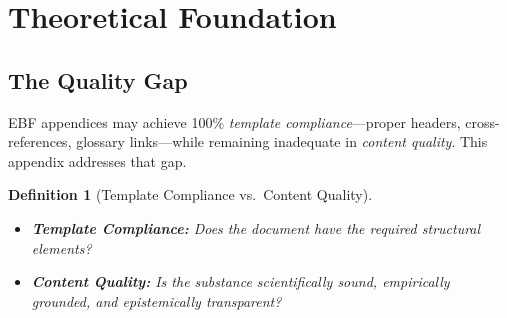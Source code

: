\documentclass[11pt,a4paper]{article}
\newtheorem{definition}{Definition}[section]
\begin{document}

\begin{abstract}
This appendix establishes the Quality Assessment Framework for EBF, distinguishing \emph{template compliance} (formal structure) from \emph{content quality} (scientific substance). The TERAN framework—assessing Theory, Evidence, Rigor, Applicability, and Transparency—is derived from the peer-reviewed Quality Assessment Framework (QAF) of Belcher et al.\ (2016), supplemented by the TACT framework (2023), Glassick Criteria (1997), and Guba's naturalistic evaluation criteria (1981). We define five epistemic status tags (EMP, THR, LLM, ILL, HYP) to ensure transparency about the evidential basis of all claims and parameters. The framework enables systematic quality tracking and provides actionable guidance for improving EBF documentation toward publication readiness.
\end{abstract}


\section{Theoretical Foundation}
\label{sec:foundation}

\subsection{The Quality Gap}

EBF appendices may achieve 100\% \emph{template compliance}—proper headers, cross-references, glossary links—while remaining inadequate in \emph{content quality}. This appendix addresses that gap.

\begin{definition}[Template Compliance vs.\ Content Quality]
\begin{itemize}
    \item \textbf{Template Compliance:} Does the document have the required structural elements?
    \item \textbf{Content Quality:} Is the substance scientifically sound, empirically grounded, and epistemically transparent?
\end{itemize}
\end{definition}
\end{document}
